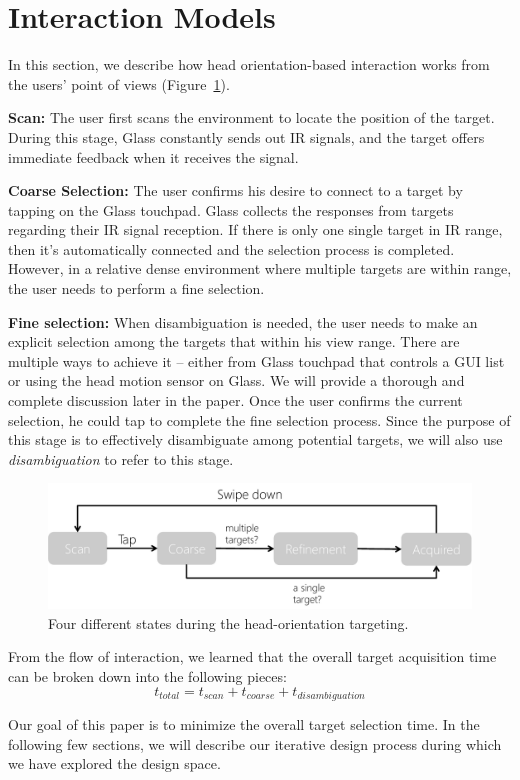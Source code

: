 
\section{Interaction Models}

In this section, we describe how head orientation-based interaction works from the users' point of views (Figure~\ref{fig:interaction}). 

{\bf Scan:} The user first scans the environment to locate the position of the target. During this stage, Glass constantly sends out IR signals, and the target offers immediate feedback when it receives the signal. 

{\bf Coarse Selection:} The user confirms his desire to connect to a target by tapping on the Glass touchpad. Glass collects the responses from targets regarding their IR signal reception. If there is only one single target in IR range, then it's automatically connected and the selection process is completed. However, in a relative dense environment where multiple targets are within range, the user needs to perform a fine selection.

{\bf Fine selection:} When disambiguation is needed, the user needs to make an explicit selection among the targets that within his view range. There are multiple ways to achieve it -- either from Glass touchpad that controls a GUI list or using the head motion sensor on Glass. We will provide a thorough and complete discussion later in the paper. Once the user confirms the current selection, he could tap to complete the fine selection process. Since the purpose of this stage is to effectively disambiguate among potential targets, we will also use {\em disambiguation} to refer to this stage.

\begin{figure}[t!]
\centering
\includegraphics[width=\columnwidth]{figures/interactionModel.pdf}
\caption{Four different states during the head-orientation targeting.}
\label{fig:interaction}
\end{figure}

From the flow of interaction, we learned that the overall target acquisition time can be broken down into the following pieces:
\begin{equation}
t_{total}=t_{scan}+t_{coarse}+t_{disambiguation}
\end{equation}

Our goal of this paper is to minimize the overall target selection time. In the following few sections, we will describe our iterative design process during which we have explored the design space.

